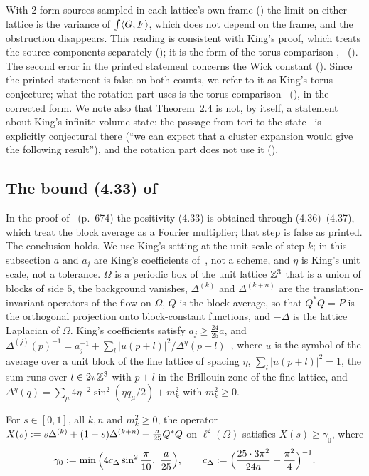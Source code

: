 With $2$-form sources sampled in each lattice's own frame () the limit on either lattice is the variance of $\int\langle G,F\rangle$, which does not depend on the frame, and the obstruction disappears. This reading is consistent with King's proof, which treats the source components separately (); it is the form of the torus comparison \Kz, \Ka\ (). The second error in the printed statement concerns the Wick constant (). Since the printed statement is false on both counts, we refer to it as King's torus conjecture; what the rotation part uses is the torus comparison \Kz\ (), in the corrected form. We note also that Theorem~2.4 is not, by itself, a statement about King's infinite-volume state: the passage from tori to the state~\cite[(2.24)--(2.25)]{K2} is explicitly conjectural there (``we can expect that a cluster expansion would give the following result''), and the rotation part does not use it ().

\subsection{The bound (4.33) of~\cite{K1}}

In the proof of~\cite[Lemma~4.5]{K1} (p.~674) the positivity (4.33) is obtained through (4.36)--(4.37), which treat the block average as a Fourier multiplier; that step is false as printed. The conclusion holds. We use King's setting at the unit scale of step $k$; in this subsection $a$ and $a_j$ are King's coefficients of~\cite[(4.5)]{K1}, not a scheme, and $\eta$ is King's unit scale, not a tolerance. $\Omega$ is a periodic box of the unit lattice $\mathbb Z^3$ that is a union of blocks of side $5$, the background vanishes, $\Delta^{(k)}$ and $\Delta^{(k+n)}$ are the translation-invariant operators of the flow on $\Omega$, $Q$ is the block average, so that $Q^*Q=P$ is the orthogonal projection onto block-constant functions, and $-\Delta$ is the lattice Laplacian of $\Omega$. King's coefficients satisfy $a_j\ge\frac{24}{25}a$, and $\Delta^{(j)}(p)^{-1}=a_j^{-1}+\sum_l|u(p+l)|^2/\Delta^{\eta}(p+l)$~\cite[(4.5)]{K1}, where $u$ is the symbol of the average over a unit block of the fine lattice of spacing $\eta$, $\sum_l|u(p+l)|^2=1$, the sum runs over $l\in2\pi\mathbb Z^3$ with $p+l$ in the Brillouin zone of the fine lattice, and $\Delta^\eta(q)=\sum_\mu4\eta^{-2}\sin^2(\eta q_\mu/2)+m_k^2$ with $m_k^2\ge0$.

\begin{proposition}\label{rot:prop:433}
For $s\in[0,1]$, all $k,n$ and $m_k^2\ge0$, the operator $X(s):= s\Delta^{(k)}+(1-s)\Delta^{(k+n)}+\frac a{25}Q^*Q$ on $\ell^2(\Omega)$ satisfies $X(s)\ge\gamma_0$, where
\[
\gamma_0\defeq\min\Big(4c_\Delta\sin^2\frac\pi{10},\ \frac a{25}\Big),\qquad
c_\Delta\defeq\Big(\frac{25\cdot3\pi^2}{24a}+\frac{\pi^2}4\Big)^{-1}.
\]
\end{proposition}

